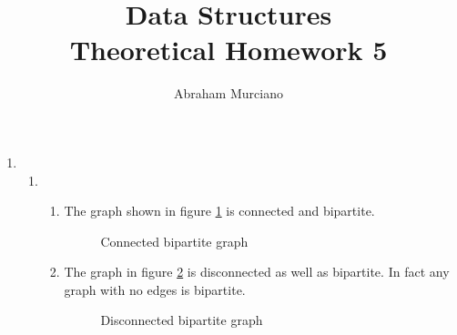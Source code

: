 \documentclass[fleqn]{article}
\title{Data Structures \\
\large Theoretical Homework 5}
\author{Abraham Murciano}
\begin{document}
\maketitle

\begin{enumerate}

	\item %
	\begin{enumerate}
		\item %
		\begin{enumerate}
			\item %
			The graph shown in figure \ref{fig:connected_bipartate_graph} is connected and bipartite.
			\begin{figure}[h]
				\centering
				\caption{Connected bipartite graph}
				\label{fig:connected_bipartate_graph}
			\end{figure}
								
			\item %
			The graph in figure \ref{fig:disconnected_bipartate_graph} is disconnected as well as bipartite. In fact any graph with no edges is bipartite.
			\begin{figure}[h]
				\centering
				\caption{Disconnected bipartite graph}
				\label{fig:disconnected_bipartate_graph}
			\end{figure}
		\end{enumerate}


\end{enumerate}
\end{enumerate}
\end{document}
